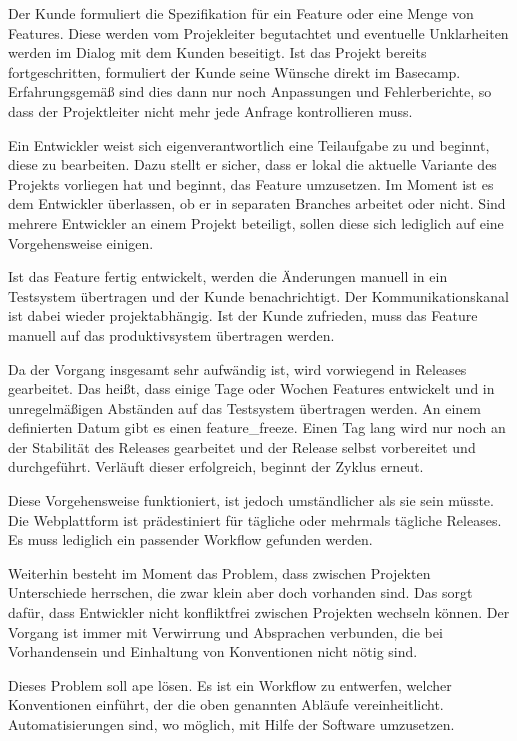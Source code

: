 Der Kunde formuliert die Spezifikation für ein Feature oder eine Menge von Features. Diese werden vom Projekleiter begutachtet und eventuelle Unklarheiten werden im Dialog mit dem Kunden beseitigt. Ist das Projekt bereits fortgeschritten, formuliert der Kunde seine Wünsche direkt im Basecamp. Erfahrungsgemäß sind dies dann nur noch Anpassungen und Fehlerberichte, so dass der Projektleiter nicht mehr jede Anfrage kontrollieren muss.

Ein Entwickler weist sich eigenverantwortlich eine Teilaufgabe zu und beginnt, diese zu bearbeiten. Dazu stellt er sicher, dass er lokal die aktuelle Variante des Projekts vorliegen hat und beginnt, das Feature umzusetzen. Im Moment ist es dem Entwickler überlassen, ob er in separaten Branches arbeitet oder nicht. Sind mehrere Entwickler an einem Projekt beteiligt, sollen diese sich lediglich auf eine Vorgehensweise einigen.

Ist das Feature fertig entwickelt, werden die Änderungen manuell in ein Testsystem übertragen und der Kunde benachrichtigt. Der Kommunikationskanal ist dabei wieder projektabhängig. Ist der Kunde zufrieden, muss das Feature manuell auf das \gls{produktivsystem} übertragen werden.

Da der Vorgang insgesamt sehr aufwändig ist, wird vorwiegend in Releases gearbeitet. Das heißt, dass einige Tage oder Wochen Features entwickelt und in unregelmäßigen Abständen auf das Testsystem übertragen werden. An einem definierten Datum gibt es einen \gls{feature_freeze}. Einen Tag lang wird nur noch an der Stabilität des Releases gearbeitet und der Release selbst vorbereitet und durchgeführt. Verläuft dieser erfolgreich, beginnt der Zyklus erneut.

Diese Vorgehensweise funktioniert, ist jedoch umständlicher als sie sein müsste. Die Webplattform ist prädestiniert für tägliche oder mehrmals tägliche Releases. Es muss lediglich ein passender Workflow gefunden werden.

Weiterhin besteht im Moment das Problem, dass zwischen Projekten Unterschiede herrschen, die zwar klein aber doch vorhanden sind. Das sorgt dafür, dass Entwickler nicht konfliktfrei zwischen Projekten wechseln können. Der Vorgang ist immer mit Verwirrung und Absprachen verbunden, die bei Vorhandensein und Einhaltung von Konventionen nicht nötig sind.

Dieses Problem soll \gls{ape} lösen. Es ist ein Workflow zu entwerfen, welcher Konventionen einführt, der die oben genannten Abläufe vereinheitlicht. Automatisierungen sind, wo möglich, mit Hilfe der Software umzusetzen.

